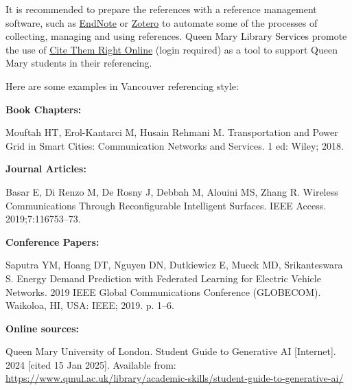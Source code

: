 \documentclass[12pt,a4paper,UTF8]{article}
\begin{document}
It is recommended to prepare the references with a reference management software, such as \href{https://www.qmul.ac.uk/library/academic-skills/endnote/endnote-online/}{EndNote} or \href{https://qmplus.qmul.ac.uk/mod/book/view.php?id=653429&chapterid=66169}{Zotero} to automate some of the processes of collecting, managing and using references. Queen Mary Library Services promote the use of \href{http://ezproxy.library.qmul.ac.uk/login?url=https://www.citethemrightonline.com/}{Cite Them Right Online} (login required) as a tool to support Queen Mary students in their referencing.

Here are some examples in Vancouver referencing style:

\textbf{Book Chapters:}

Mouftah HT, Erol-Kantarci M, Husain Rehmani M. Transportation and Power Grid in Smart Cities: Communication Networks and Services. 1 ed: Wiley; 2018.

\textbf{Journal Articles:}

Basar E, Di Renzo M, De Rosny J, Debbah M, Alouini MS, Zhang R. Wireless Communications Through Reconfigurable Intelligent Surfaces. IEEE Access. 2019;7:116753–73.

\textbf{Conference Papers:}

Saputra YM, Hoang DT, Nguyen DN, Dutkiewicz E, Mueck MD, Srikanteswara S. Energy Demand Prediction with Federated Learning for Electric Vehicle Networks. 2019 IEEE Global Communications Conference (GLOBECOM). Waikoloa, HI, USA: IEEE; 2019. p. 1–6.

\textbf{Online sources:}

Queen Mary University of London. Student Guide to Generative AI [Internet]. 2024 [cited 15 Jan 2025]. Available from: \href{https://www.qmul.ac.uk/library/academic-skills/student-guide-to-generative-ai/}{https://www.qmul.ac.uk/library/academic-skills/student-guide-to-generative-ai/}



\newpage


\newpage


\newpage


\newpage


\newpage


\newpage


\newpage


\newpage

\end{document}

